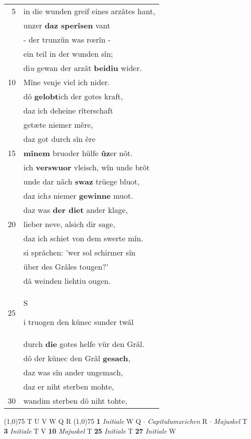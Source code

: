 \documentclass[8pt,a4paper,notitlepage]{article}
\begin{document}
\begin{table}[ht]
\begin{minipage}[t]{0.5\linewidth}
\begin{tabular}{rl}
5 & in die wunden greif eines arzâtes hant,\\ 
 & unzer \textbf{daz sperîsen} vant\\ 
 & - der trunzûn was rœrîn -\\ 
 & ein teil in der wunden sîn;\\ 
 & di\textit{u} gewan der arzât \textbf{beidiu} wider.\\ 
10 & Mîne venje viel ich nider.\\ 
 & dô \textbf{gelobt}ich der gotes kraft,\\ 
 & daz ich deheine rîterschaft\\ 
 & getæte niemer mêre,\\ 
 & daz got durch sîn êre\\ 
15 & \textbf{mînem} bruoder hülfe \textbf{ûz}er nôt.\\ 
 & ich \textbf{verswuor} vleisch, wîn unde brôt\\ 
 & unde dar nâch \textbf{swaz} trüege bluot,\\ 
 & daz ich\textit{s} niemer \textbf{gewinne} muot.\\ 
 & daz was \textbf{der diet} ander klage,\\ 
20 & lieber neve, alsich dir sage,\\ 
 & daz ich schiet von dem swerte mîn.\\ 
 & si sprâchen: 'wer sol schirmer sîn\\ 
 & über des Grâles tougen?'\\ 
 & dâ weinden liehtiu ougen.\\ 
25 & \begin{large}S\end{large}i truogen den künec sunder twâl\\ 
 & durch \textbf{die} gotes helfe vür den Grâl.\\ 
 & dô der künec den Grâl \textbf{gesach},\\ 
 & daz was sîn ander ungemach,\\ 
 & daz er niht sterben mohte,\\ 
30 & wandim sterben dô niht tohte,\\ 
\end{tabular}
\scriptsize
\line(1,0){75} \newline
T U V W Q R \newline
\line(1,0){75} \newline
\textbf{1} \textit{Initiale} W Q   $\cdot$ \textit{Capitulumzeichen} R   $\cdot$ \textit{Majuskel} T  \textbf{3} \textit{Initiale} T V  \textbf{10} \textit{Majuskel} T  \textbf{25} \textit{Initiale} T  \textbf{27} \textit{Initiale} W  \newline

\end{minipage}
\end{table}
\end{document}

